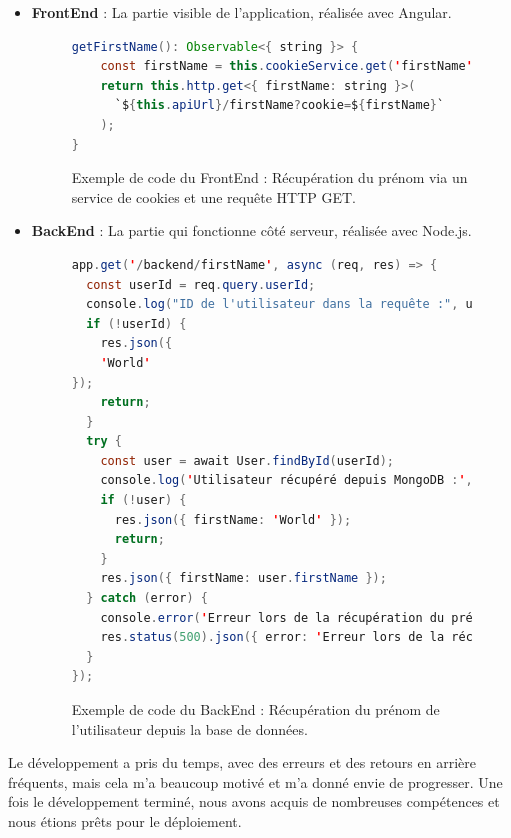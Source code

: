 \begin{itemize}
    \item \textbf{FrontEnd} : La partie visible de l’application, réalisée avec Angular.
    \begin{figure}[H]
        \centering
        \begin{minipage}{.6\textwidth}
            \centering
            \begin{lstlisting}[language=Java]
getFirstName(): Observable<{ string }> {
    const firstName = this.cookieService.get('firstName');
    return this.http.get<{ firstName: string }>(
      `${this.apiUrl}/firstName?cookie=${firstName}`
    );
}
            \end{lstlisting}
            \caption{Exemple de code du FrontEnd : Récupération du prénom via un service de cookies et une requête HTTP GET.}
        \end{minipage}
    \end{figure}

    \item \textbf{BackEnd} : La partie qui fonctionne côté serveur, réalisée avec Node.js.
    \begin{figure}[H]
        \centering
        \begin{minipage}{.6\textwidth}
            \centering
            \begin{lstlisting}[language=Java]
app.get('/backend/firstName', async (req, res) => {
  const userId = req.query.userId;
  console.log("ID de l'utilisateur dans la requête :", userId);
  if (!userId) {
    res.json({
    'World'
});
    return;
  }
  try {
    const user = await User.findById(userId);
    console.log('Utilisateur récupéré depuis MongoDB :', user);
    if (!user) {
      res.json({ firstName: 'World' });
      return;
    }
    res.json({ firstName: user.firstName });
  } catch (error) {
    console.error('Erreur lors de la récupération du prénom depuis MongoDB :', error);
    res.status(500).json({ error: 'Erreur lors de la récupération du prénom.' });
  }
});
            \end{lstlisting}
            \caption{Exemple de code du BackEnd : Récupération du prénom de l'utilisateur depuis la base de données.}
        \end{minipage}
    \end{figure}
\end{itemize}

Le développement a pris du temps, avec des erreurs et des retours en arrière fréquents, mais cela m'a beaucoup motivé et m'a donné envie de progresser.
Une fois le développement terminé, nous avons acquis de nombreuses compétences et nous étions prêts pour le déploiement.

